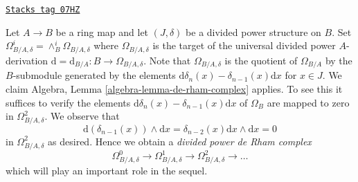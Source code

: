 \begin{remark}
\label{crystalline-remark-divided-powers-de-rham-complex}
\href{https://stacks.math.columbia.edu/tag/07HZ}{\texttt{Stacks tag 07HZ}}

Let $A \to B$ be a ring map and let $(J, \delta)$ be a divided power
structure on $B$. Set
$\Omega_{B/A, \delta}^i = \wedge^i_B \Omega_{B/A, \delta}$
where $\Omega_{B/A, \delta}$ is the target of the universal divided power
$A$-derivation $\text{d} = \text{d}_{B/A} : B \to \Omega_{B/A, \delta}$.
Note that $\Omega_{B/A, \delta}$ is the quotient of $\Omega_{B/A}$ by the
$B$-submodule generated by the elements
$\text{d}\delta_n(x) - \delta_{n - 1}(x)\text{d}x$ for $x \in J$.
We claim Algebra, Lemma \ref{algebra-lemma-de-rham-complex} applies.
To see this it suffices to verify the elements
$\text{d}\delta_n(x) - \delta_{n - 1}(x)\text{d}x$
of $\Omega_B$ are mapped to zero in $\Omega^2_{B/A, \delta}$.
We observe that
$$
\text{d}(\delta_{n - 1}(x)) \wedge \text{d}x
= \delta_{n - 2}(x) \text{d}x \wedge \text{d}x = 0
$$
in $\Omega^2_{B/A, \delta}$ as desired. Hence we obtain a
{\it divided power de Rham complex}
$$
\Omega^0_{B/A, \delta} \to \Omega^1_{B/A, \delta} \to
\Omega^2_{B/A, \delta} \to \ldots
$$
which will play an important role in the sequel.
\end{remark}

